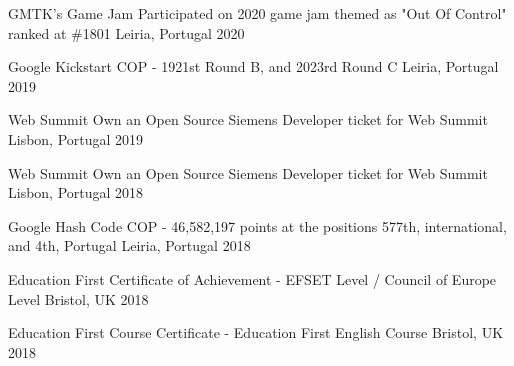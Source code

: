 



\begin{cvhonors}

  \cvhonor
    {GMTK’s Game Jam} %
    {Participated on 2020 game jam themed as "Out Of Control" ranked at \#1801} %
    {Leiria, Portugal} %
    {2020} %

  \cvhonor
    {Google Kickstart} %
    {COP - 1921st Round B, and 2023rd Round C} %
    {Leiria, Portugal} %
    {2019} %

  \cvhonor
    {Web Summit} %
    {Own an Open Source Siemens Developer ticket for Web Summit} %
    {Lisbon, Portugal} %
    {2019} %

  \cvhonor
    {Web Summit} %
    {Own an Open Source Siemens Developer ticket for Web Summit} %
    {Lisbon, Portugal} %
    {2018} %

  \cvhonor
    {Google Hash Code} %
    {COP - 46,582,197 points at the positions 577th, international, and 4th, Portugal} %
    {Leiria, Portugal} %
    {2018} %
    
  \cvhonor
    {Education First} %
    {Certificate of Achievement - EFSET Level / Council of Europe Level} %
    {Bristol, UK} %
    {2018} %
    
  \cvhonor
    {Education First} %
    {Course Certificate - Education First English Course} %
    {Bristol, UK} %
    {2018} %

\end{cvhonors}

